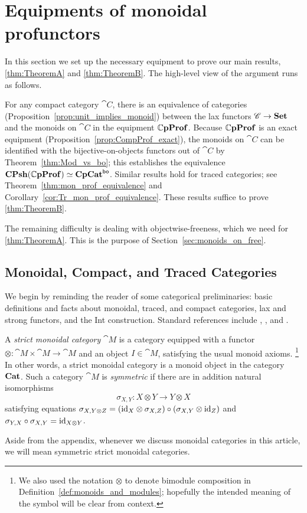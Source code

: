 \documentclass[11pt,oneside,article]{memoir}
\begin{document}
\chapter{Equipments of monoidal profunctors}
    \label{chap:equipments_monoidal_profunctors}

In this section we set up the necessary equipment to prove our main results, \ref{thm:TheoremA} and
\ref{thm:TheoremB}. The high-level view of the argument runs as follows.

For any compact category $\cat{C}$, there is an equivalence
of categories (Proposition~\ref{prop:unit_implies_monoid}) between the lax functors $\mathscr{C}\to\mathbf{Set}$
and the monoids on $\cat{C}$ in the equipment $\mathbb{C}\mathbf{pProf}$. Because
$\mathbb{C}\mathbf{pProf}$ is an exact equipment (Proposition~\ref{prop:CompProf_exact}), the monoids on $\cat{C}$
can be identified with the bijective-on-objects functors out of $\cat{C}$ by
Theorem~\ref{thm:Mod_vs_bo}; this establishes the equivalence
$\mathbf{CPsh}(\mathbb{C}\mathbf{pProf})\simeq\mathbf{CpCat}^{\mathsf{bo}}$. Similar results hold for traced categories; see
Theorem~\ref{thm:mon_prof_equivalence} and Corollary~\ref{cor:Tr_mon_prof_equivalence}. These
results suffice to prove \ref{thm:TheoremB}.

The remaining difficulty is dealing with objectwise-freeness, which we need for \ref{thm:TheoremA}.
This is the purpose of Section~\ref{sec:monoids_on_free}. 

\section{Monoidal, Compact, and Traced Categories}
   \label{sec:monoidal,compact,traced}
We begin by reminding the reader of some categorical preliminaries: basic definitions and facts about monoidal, traced, and compact categories, lax and strong functors, and the Int construction. Standard references include \cite{KellyLaplaza}, \cite{JoyalStreet}, and \cite{JoyalStreetVerity}.

A \emph{strict monoidal category} $\cat{M}$ is a category equipped with a functor
$\otimes\colon\cat{M}\times\cat{M}\to\cat{M}$ and an object $I\in\cat{M}$, satisfying the usual
monoid axioms.%
\footnote{
We also used the notation $\otimes$ to denote bimodule composition in Definition~\ref{def:monoids_and_modules}; hopefully the intended meaning of the symbol will be clear from context.
}
In other words, a strict monoidal category is a monoid object in the category $\mathbf{Cat}$.
Such a category $\cat{M}$ is \emph{symmetric} if there are in addition natural
isomorphisms
\[
   \sigma_{X,Y}\colon X\otimes Y\to Y\otimes X
\]
satisfying equations $\sigma_{X,Y\otimes Z}=(\mathrm{id}_X\otimes\sigma_{X,Z})\circ(\sigma_{X,Y}\otimes
\mathrm{id}_Z)$ and $\sigma_{Y,X}\circ\sigma_{X,Y}=\mathrm{id}_{X\otimes Y}$.
\begin{warning}
      \label{warn:symmetric}
   Aside from the appendix, whenever we discuss monoidal categories in this article, we will mean symmetric strict monoidal categories.
\end{warning}
\end{document}
